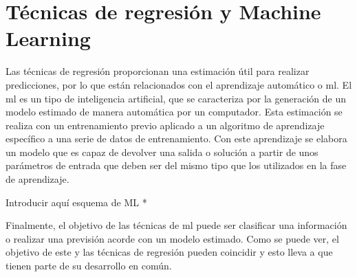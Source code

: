 \section{Técnicas de regresión y Machine Learning}
\par Las técnicas de regresión proporcionan una estimación útil para realizar predicciones, por lo que están relacionados con el aprendizaje automático o \gls{ml}. El \gls{ml} es un tipo de inteligencia artificial, que se caracteriza por la generación de un modelo estimado de manera automática por un computador. Esta estimación se realiza con un entrenamiento previo aplicado a un algoritmo de aprendizaje específico a una serie de datos de entrenamiento. Con este aprendizaje se elabora un modelo que es capaz de devolver una salida o solución a partir de unos parámetros de entrada que deben ser del mismo tipo que los utilizados en la fase de aprendizaje. 
\\
\par * Introducir aquí esquema de ML *
\\
\par Finalmente, el objetivo de las técnicas de \gls{ml} puede ser clasificar una información o realizar una previsión acorde con un modelo estimado. Como se puede ver, el objetivo de este y las técnicas de regresión pueden coincidir y esto lleva a que tienen parte de su desarrollo en común. 

